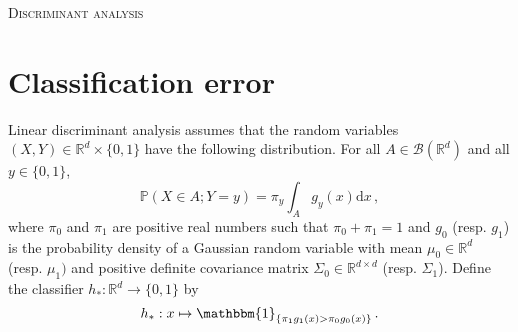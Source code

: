 \documentclass[a4paper,10pt,fleqn]{article}
\newcommand{\eqsp}{\,}
\newcommand{\rmd}{\mathrm{d}}
\newcommand{\rset}{\ensuremath{\mathbb{R}}}
\newcommand{\bP}{\mathbb{P}}
\newcommand{\1}{\ensuremath{\mathbbm{1}}}
\begin{document}

\noindent\hrulefill

\begin{center}
\textsc{Discriminant analysis}
\end{center}
\hrulefill

\section{Classification error}
Linear discriminant analysis assumes that the random variables $(X,Y)\in \rset^d\times\{0,1\}$ have the following distribution. For all $A\in \mathcal{B}(\mathbb{R}^d)$ and all $y\in\{0,1\}$,
\[
\bP\left(X\in A;Y=y\right) = \pi_y \int_A g_y(x) \rmd x\eqsp,
\]
where $\pi_{0}$ and $\pi_1$ are positive real numbers such that $\pi_0+\pi_{1}=1$ and $g_0$ (resp. $g_1$) is the probability density of a Gaussian random variable with mean $\mu_0\in\rset^d$ (resp. $\mu_1)$ and positive definite covariance matrix $\Sigma_0\in \rset^{d\times d}$ (resp. $\Sigma_1$).  Define the classifier $h_{*}:\mathbb{R}^d\to\{0,1\}$ by
$$
h_{*}:x \mapsto \1_{\{\pi_{1}g_{1}(x)>\pi_{0}g_{0}(x)\}}\eqsp.
$$
\end{document}
